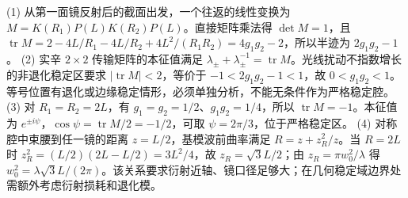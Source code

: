 (1) 从第一面镜反射后的截面出发，一个往返的线性变换为 \(M=K(R_1)P(L)K(R_2)P(L)\)。直接矩阵乘法得 \(\det M=1\)，且 \(\operatorname{tr}M=2-4L/R_1-4L/R_2+4L^2/(R_1R_2)=4g_1g_2-2\)，所以半迹为 \(2g_1g_2-1\)。
(2) 实辛 \(2\times2\) 传输矩阵的本征值满足 \(\lambda_\pm+\lambda_\pm^{-1}=\operatorname{tr}M\)。光线扰动不指数增长的非退化稳定区要求 \(|\operatorname{tr}M|<2\)，等价于 \(-1<2g_1g_2-1<1\)，故 \(0<g_1g_2<1\)。等号位置有退化或边缘稳定情形，必须单独分析，不能无条件作为严格稳定腔。
(3) 对 \(R_1=R_2=2L\)，有 \(g_1=g_2=1/2\)、\(g_1g_2=1/4\)，所以 \(\operatorname{tr}M=-1\)。本征值为 \(e^{\pm i\psi}\)，\(\cos\psi=\operatorname{tr}M/2=-1/2\)，可取 \(\psi=2\pi/3\)，位于严格稳定区。
(4) 对称腔中束腰到任一镜的距离 \(z=L/2\)，基模波前曲率满足 \(R=z+z_R^2/z\)。当 \(R=2L\) 时 \(z_R^2=(L/2)(2L-L/2)=3L^2/4\)，故 \(z_R=\sqrt3L/2\)；由 \(z_R=\pi w_0^2/\lambda\) 得 \(w_0^2=\lambda\sqrt3L/(2\pi)\)。该关系要求衍射近轴、镜口径足够大；在几何稳定域边界处需额外考虑衍射损耗和退化模。
